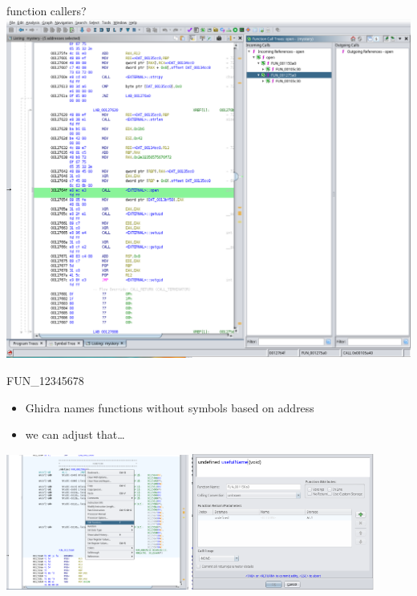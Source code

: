 \begin{frame}{function callers?}
\includegraphics[width=\textwidth]{../re-tools/ghidra-symb-refs-ex}
\end{frame}

\begin{frame}{FUN\_12345678}
    \begin{itemize}
    \item Ghidra names functions without symbols based on address
    \item we can adjust that\ldots
    \end{itemize}
\includegraphics[width=0.45\textwidth]{../re-tools/ghidra-edit-func-cut}
\includegraphics[width=0.45\textwidth]{../re-tools/ghidra-edit-func-dialog}
\end{frame}

